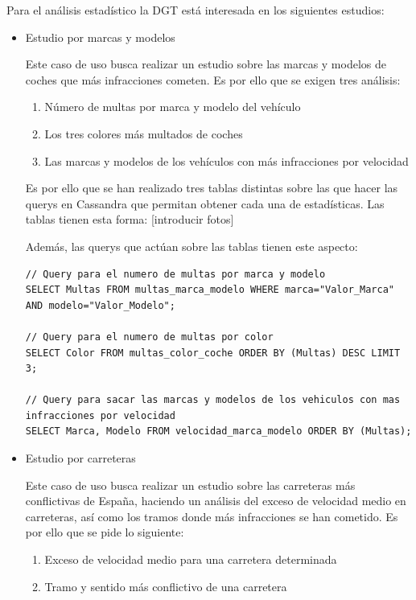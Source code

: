 \documentclass[]{article}
\begin{document}
Para el análisis estadístico la DGT está interesada en los siguientes estudios:
\begin{itemize}
    \item Estudio por marcas y modelos

    Este caso de uso busca realizar un estudio sobre las marcas y modelos de coches que más infracciones cometen. Es por ello que se exigen tres análisis:
    
    \begin{enumerate}
        \item Número de multas por marca y modelo del vehículo
        \item Los tres colores más multados de coches
        \item Las marcas y modelos de los vehículos con más infracciones por velocidad
    \end{enumerate}

    Es por ello que se han realizado tres tablas distintas sobre las que hacer las querys en Cassandra que permitan obtener cada una de estadísticas. Las tablas tienen esta forma: [introducir fotos]

    Además, las querys que actúan sobre las tablas tienen este aspecto:

    \lstset{style=cql}
    \begin{lstlisting}[language=cql, caption=Querys para el caso de uso 1]
// Query para el numero de multas por marca y modelo
SELECT Multas FROM multas_marca_modelo WHERE marca="Valor_Marca" AND modelo="Valor_Modelo";

// Query para el numero de multas por color
SELECT Color FROM multas_color_coche ORDER BY (Multas) DESC LIMIT 3;

// Query para sacar las marcas y modelos de los vehiculos con mas infracciones por velocidad
SELECT Marca, Modelo FROM velocidad_marca_modelo ORDER BY (Multas);
    \end{lstlisting}

    \item Estudio por carreteras

    Este caso de uso busca realizar un estudio sobre las carreteras más conflictivas de España, haciendo un análisis del exceso de velocidad medio en carreteras, así como los tramos donde más infracciones se han cometido. Es por ello que se pide lo siguiente:

    \begin{enumerate}
        \item Exceso de velocidad medio para una carretera determinada
        \item Tramo y sentido más conflictivo de una carretera 
    \end{enumerate}


\end{itemize}
\end{document}
